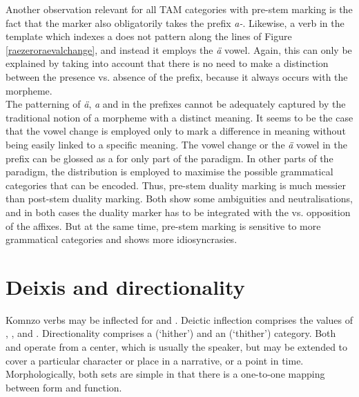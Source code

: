 Another observation relevant for all TAM categories with pre-stem  marking is the fact that the  marker also obligatorily takes the  prefix \emph{a-}. Likewise, a verb in the  template which indexes a   does not pattern along the lines of Figure \ref{raezeroraevalchange}, and instead it employs the \emph{ä} vowel. Again, this can only be explained by taking into account that there is no need to make a distinction between the presence vs. absence of the  prefix, because it always occurs with the  morpheme.\\

The patterning of \emph{ä}, \emph{a} and \emph{\Zero} in the prefixes cannot be adequately captured by the traditional notion of a morpheme with a distinct meaning. It seems to be the case that the vowel change is employed only to mark a difference in meaning without being easily linked to a specific meaning. The vowel change or the \emph{ä} vowel in the prefix can be glossed as a  for only part of the paradigm. In other parts of the paradigm, the distribution is employed to maximise the possible grammatical categories that can be encoded. Thus, pre-stem duality marking is much messier than post-stem duality marking. Both show some ambiguities and neutralisations, and in both cases the duality marker has to be integrated with the  vs.  opposition of the  affixes. But at the same time, pre-stem  marking is sensitive to more grammatical categories and shows more idiosyncrasies.

\section{Deixis and directionality} \label{deixisanddirectionality}

Komnzo verbs may be inflected for  and . Deictic inflection comprises the values of , ,  and . Directionality comprises a  (`hither') and an  (`thither') category. Both  and  operate from a  center, which is usually the speaker, but may be extended to cover a particular character or place in a narrative, or a point in time. Morphologically, both sets are simple in that there is a one-to-one mapping between form and function.

